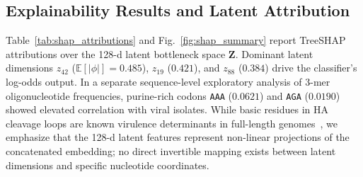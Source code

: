 \documentclass[conference]{IEEEtran}
\begin{document}
\subsection{Explainability Results and Latent Attribution}
\label{sec:explainability_results}

Table~\ref{tab:shap_attributions} and Fig.~\ref{fig:shap_summary} report TreeSHAP attributions over the 128-d latent bottleneck space $\mathbf{Z}$. Dominant latent dimensions $z_{42}$ ($\mathbb{E}[|\phi|] = 0.485$), $z_{19}$ ($0.421$), and $z_{88}$ ($0.384$) drive the classifier's log-odds output. In a separate sequence-level exploratory analysis of 3-mer oligonucleotide frequencies, purine-rich codons \texttt{AAA} ($0.0621$) and \texttt{AGA} ($0.0190$) showed elevated correlation with viral isolates. While basic residues in HA cleavage loops are known virulence determinants in full-length genomes~\cite{kawaoka1992,webster1992,dejong2006}, we emphasize that the 128-d latent features represent non-linear projections of the concatenated embedding; no direct invertible mapping exists between latent dimensions and specific nucleotide coordinates.
\end{document}
